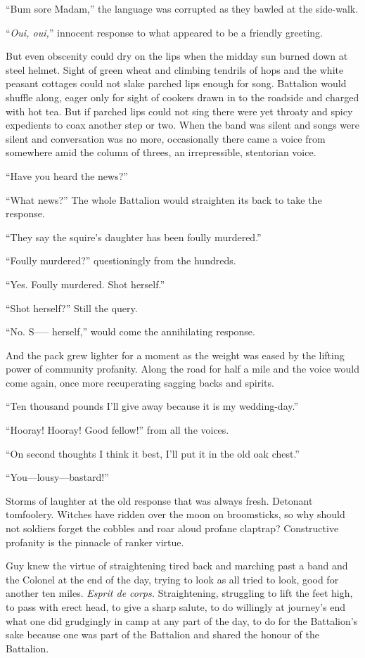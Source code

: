 ``Bum sore Madam,'' the language was corrupted as they bawled at the side-walk.

``\textit{Oui, oui,}'' innocent response to what appeared to be a friendly greeting.

But even obscenity could dry on the lips when the midday sun burned down at steel helmet. Sight of green wheat and climbing tendrils of hops and the white peasant cottages could not slake parched lips enough for song. Battalion would shuffle along, eager only for sight of cookers drawn in to the roadside and charged with hot tea. But if parched lips could not sing there were yet throaty and spicy expedients to coax another step or two. When the band was silent and songs were silent and conversation was no more, occasionally there came a voice from somewhere amid the column of threes, an irrepressible, stentorian voice.

``Have you heard the news?''

``What news?'' The whole Battalion would straighten its back to take the response.

``They say the squire's daughter has been foully murdered.''

``Foully murdered?'' questioningly from the hundreds.

``Yes. Foully murdered. Shot herself.''

``Shot herself?'' Still the query.

``No. S----- herself,'' would come the annihilating response.

And the pack grew lighter for a moment as the weight was eased by the lifting power of community profanity. Along the road for half a mile and the voice would come again, once more recuperating sagging backs and spirits.

``Ten thousand pounds I'll give away because it is my wedding-day.''

``Hooray! Hooray! Good fellow!'' from all the voices.

``On second thoughts I think it best, I'll put it in the old oak chest.''

``You---lousy---bastard!''

Storms of laughter at the old response that was always fresh. Detonant tomfoolery. Witches have ridden over the moon on broomsticks, so why should not soldiers forget the cobbles and roar aloud profane claptrap? Constructive profanity is the pinnacle of ranker virtue.

Guy knew the virtue of straightening tired back and marching past a band and the Colonel at the end of the day, trying to look as all tried to look, good for another ten miles. \textit{Esprit de corps.} Straightening, struggling to lift the feet high, to pass with erect head, to give a sharp salute, to do willingly at journey's end what one did grudgingly in camp at any part of the day, to do for the Battalion's sake because one was part of the Battalion and shared the honour of the Battalion.